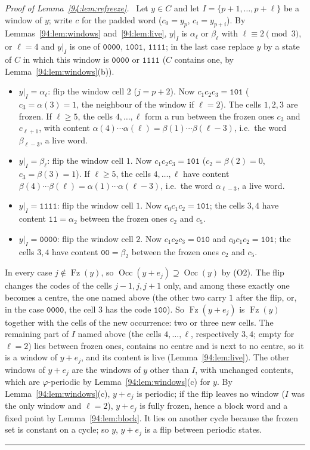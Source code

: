 \documentclass[10pt,a4paper]{article}
\newcommand{\qedmark}{\rule{1.1ex}{1.1ex}}
\newenvironment{proof}[1][Proof]{\par\smallskip\noindent\textit{#1.}\ }{\hfill\qedmark\par\smallskip}
\newcommand{\code}[1]{\mathtt{#1}}            %
\newcommand{\Occ}{\operatorname{Occ}}         %
\newcommand{\Fz}{\operatorname{Fz}}           %
\begin{document}
\begin{proof}[Proof of Lemma~\ref{94:lem:refreeze}]
Let $y\in C$ and let $I=\{p+1,\dots,p+\ell\}$ be a window of $y$; write $c$ for the padded word ($c_0=y_p$,
$c_i=y_{p+i}$). By Lemmas~\ref{94:lem:windows} and~\ref{94:lem:live}, $y|_I$ is $\alpha_\ell$ or $\beta_\ell$ with
$\ell\equiv2\pmod3$, or $\ell=4$ and $y|_I$ is one of $\code{0000}$, $\code{1001}$, $\code{1111}$; in the last
case replace $y$ by a state of $C$ in which this window is $\code{0000}$ or $\code{1111}$ ($C$ contains one, by
Lemma~\ref{94:lem:windows}(b)).
\begin{itemize}[leftmargin=*,nosep]
\item $y|_I=\alpha_\ell$: flip the window cell $2$ ($j=p+2$). Now $c_1c_2c_3=\code{101}$ ($c_3=\alpha(3)=1$, the
neighbour of the window if $\ell=2$). The cells $1,2,3$ are frozen. If $\ell\ge5$, the cells $4,\dots,\ell$ form a
run between the frozen ones $c_3$ and $c_{\ell+1}$, with content
$\alpha(4)\cdots\alpha(\ell)=\beta(1)\cdots\beta(\ell-3)$, i.e.\ the word $\beta_{\ell-3}$, a live word.
\item $y|_I=\beta_\ell$: flip the window cell $1$. Now $c_1c_2c_3=\code{101}$ ($c_2=\beta(2)=0$,
$c_3=\beta(3)=1$). If $\ell\ge5$, the cells $4,\dots,\ell$ have content
$\beta(4)\cdots\beta(\ell)=\alpha(1)\cdots\alpha(\ell-3)$, i.e.\ the word $\alpha_{\ell-3}$, a live word.
\item $y|_I=\code{1111}$: flip the window cell $1$. Now $c_0c_1c_2=\code{101}$; the cells $3,4$ have content
$\code{11}=\alpha_2$ between the frozen ones $c_2$ and $c_5$.
\item $y|_I=\code{0000}$: flip the window cell $2$. Now $c_1c_2c_3=\code{010}$ and $c_0c_1c_2=\code{101}$; the
cells $3,4$ have content $\code{00}=\beta_2$ between the frozen ones $c_2$ and $c_5$.
\end{itemize}
In every case $j\notin\Fz(y)$, so $\Occ(y+e_j)\supseteq\Occ(y)$ by (O2). The flip changes the codes of the cells
$j-1,j,j+1$ only, and among these exactly one becomes a centre, the one named above (the other two carry $1$ after
the flip, or, in the case $\code{0000}$, the cell $3$ has the code $\code{100}$). So $\Fz(y+e_j)$ is $\Fz(y)$
together with the cells of the new occurrence: two or three new cells. The remaining part of $I$ named above (the
cells $4,\dots,\ell$, respectively $3,4$; empty for $\ell=2$) lies between frozen ones, contains no centre and is
next to no centre, so it is a window of $y+e_j$, and its content is live (Lemma~\ref{94:lem:live}). The other
windows of $y+e_j$ are the windows of $y$ other than $I$, with unchanged contents, which are $\varphi$-periodic by
Lemma~\ref{94:lem:windows}(c) for $y$. By Lemma~\ref{94:lem:windows}(c), $y+e_j$ is periodic; if the flip leaves
no window ($I$ was the only window and $\ell=2$), $y+e_j$ is fully frozen, hence a block word and a fixed point by
Lemma~\ref{94:lem:block}. It lies on another cycle because the frozen set is constant on a cycle; so $y$,
$y+e_j$ is a flip between periodic states.
\end{proof}
\end{document}
